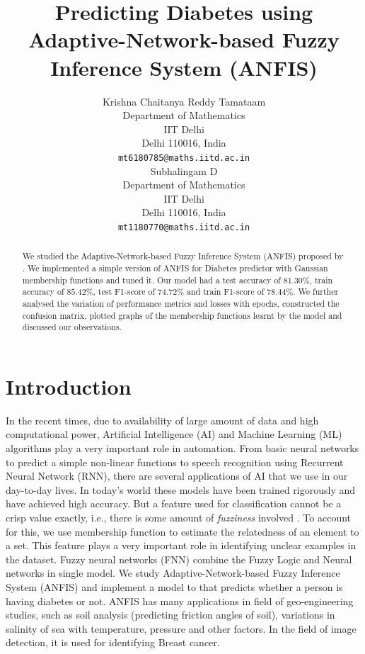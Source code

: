\documentclass[11pt,a4paper]{article}
\title{Predicting Diabetes using Adaptive-Network-based Fuzzy Inference System (ANFIS)}
\author{Krishna Chaitanya Reddy Tamataam \\
  Department of Mathematics \\
  IIT Delhi \\
  Delhi 110016, India \\
  \texttt{mt6180785@maths.iitd.ac.in} \\\And
  Subhalingam D \\
  Department of Mathematics \\
  IIT Delhi \\
  Delhi 110016, India \\
  \texttt{mt1180770@maths.iitd.ac.in} \\}
\date{}
\begin{document}
\newcommand{\varacctrain}{$85.42\%$}
\newcommand{\varacctest}{$81.30\%$}
\newcommand{\varftrain}{$78.44\%$}
\newcommand{\varftest}{$74.72\%$}
\newcommand{\varprectrain}{$81.04\%$}
\newcommand{\varprectest}{$70.83\%$}
\newcommand{\varrectrain}{$76.00\%$}
\newcommand{\varrectest}{$79.06\%$}
\newcommand{\varlosstrain}{$0.33549$}
\newcommand{\varlosstest}{$0.43418$}

\newcommand{\vargithubrepo}{\url{https://github.com/subhalingamd/ANFIS}}

\maketitle
\begin{abstract}
We studied the Adaptive-Network-based Fuzzy Inference System (ANFIS) proposed by . We implemented a simple version of ANFIS for Diabetes predictor with Gaussian membership functions and tuned it. Our model had a test accuracy of \varacctest, train accuracy of \varacctrain, test F1-score of \varftest { }and train F1-score of \varftrain. We further analysed the variation of performance metrics and losses with epochs, constructed the confusion matrix, plotted graphs of the membership functions learnt by the model and discussed our observations.
\end{abstract}



\section{Introduction}
In the recent times, due to availability of large amount of data and high computational power, Artificial Intelligence (AI) and Machine Learning (ML) algorithms play a very important role in automation. From basic neural networks to predict a simple non-linear functions to speech recognition using Recurrent Neural Network (RNN), there are several applications of AI that we use in our day-to-day lives. In today's world these models have been trained rigorously and have achieved high accuracy. But a feature used for classification cannot be a crisp value exactly, i.e., there is some amount of \textit{fuzziness} involved \cite{fuzzy:zadeh}. To account for this, we use membership function to estimate the relatedness of an element to a set. This feature plays a very important role in identifying unclear examples in the dataset. Fuzzy neural networks (FNN) combine the Fuzzy Logic and Neural networks in single model. We study Adaptive-Network-based Fuzzy Inference System (ANFIS) \cite{anfis} and implement a model to that predicts whether a person is having diabetes or not. ANFIS has many applications in field of geo-engineering studies, such as soil analysis (predicting friction angles of soil), variations in salinity of sea with temperature, pressure and other factors. In the field of image detection, it is used for identifying Breast cancer.
\end{document}
